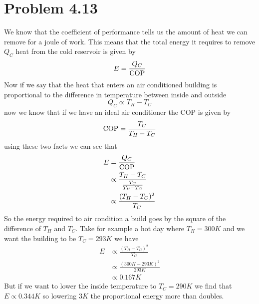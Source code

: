 \documentclass[11pt]{article}
\numberwithin{equation}{section}
\begin{document}
\section{Problem 4.13}
We know that the coefficient of performance tells us the amount of heat we can remove for a joule of work. This means that the total energy it requires to remove $Q_C$ heat from the cold reservoir is given by
$$E = \frac{Q_C}{\textnormal{COP}}$$
Now if we say that the heat that enters an air conditioned building is proportional to the difference in temperature between inside and outside
$$Q_C \propto T_H-T_C$$
now we know that if we have an ideal air conditioner the COP is given by
$$\textnormal{COP} = \frac{T_C}{T_H-T_C}$$
using these two facts we can see that
\begin{align*}
E &= \frac{Q_C}{\textnormal{COP}}\\
&\propto \frac{T_H-T_C}{\frac{T_C}{T_H-T_C}}\\
&\propto \frac{(T_H-T_C)^2}{T_C}
\end{align*}
So the energy required to air condition a build goes by the square of the difference of $T_H$ and $T_C$. Take for example a hot day where $T_H = 300\unit{K}$ and we want the building to be $T_C = 293\unit{K}$ we have
\begin{align*}
E &\propto \frac{(T_H-T_C)^2}{T_C}\\
&\propto \frac{(300\unit{K} - 293\unit{K})^2}{293\unit{K}}\\
&\propto 0.167\unit{K}
\end{align*}
But if we want to lower the inside temperature to $T_C = 290\unit{K}$ we find that $E\propto 0.344\unit{K}$ so lowering $3\unit{K}$ the proportional energy more than doubles.
\end{document}
